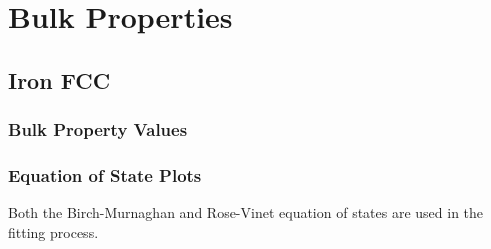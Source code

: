 \clearpage
\section{Bulk Properties}


\FloatBarrier
\subsection{Iron FCC}

\subsubsection{Bulk Property Values}




\subsubsection{Equation of State Plots}

Both the Birch-Murnaghan and Rose-Vinet equation of states are used in the fitting process.

